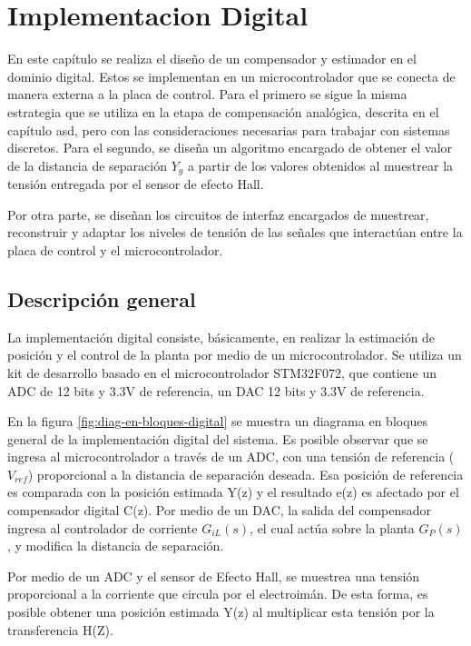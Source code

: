 \chapter{Implementacion Digital}  \label{cap:Implementacion digital}

En este capítulo se realiza el diseño de un compensador y estimador en el dominio digital. Estos se implementan en un microcontrolador que se conecta de manera externa a la placa de control. Para el primero se sigue la misma estrategia que se utiliza en la etapa de compensación analógica, descrita en el capítulo asd, pero con las consideraciones necesarias para trabajar con sistemas discretos. Para el segundo, se diseña un algoritmo encargado de obtener el valor de la distancia de separación $Y_g$ a partir de los valores obtenidos al muestrear la tensión entregada por el sensor de efecto Hall.

Por otra parte, se diseñan los circuitos de interfaz encargados de muestrear, reconstruir y adaptar los niveles de tensión de las señales que interactúan entre la placa de control y el microcontrolador.


\section{Descripción general}

\noindent La implementación digital consiste, básicamente, en realizar la estimación de posición y el control de la planta por medio de un microcontrolador. Se utiliza un kit de desarrollo basado en el microcontrolador STM32F072, que contiene un ADC de 12 bits y 3.3V de referencia, un DAC 12 bits y 3.3V de referencia.

\noindent En la figura \ref{fig:diag-en-bloques-digital} se muestra un diagrama en bloques general de la implementación digital del sistema. Es posible observar que se ingresa al microcontrolador a través de un ADC, con una tensión de referencia ($V_{ref}$) proporcional a la distancia de separación deseada. Esa posición de referencia es comparada con la posición estimada Y(z) y el resultado e(z) es afectado por el compensador digital C(z). Por medio de un DAC, la salida del compensador ingresa al controlador de corriente $G_{iL}(s)$, el cual actúa sobre la planta $G_P(s)$, y modifica la distancia de separación.

\noindent Por medio de un ADC y el sensor de Efecto Hall, se muestrea una tensión proporcional a la corriente que circula por el electroimán. De esta forma, es posible obtener una posición estimada Y(z) al multiplicar esta tensión por la transferencia H(Z).


